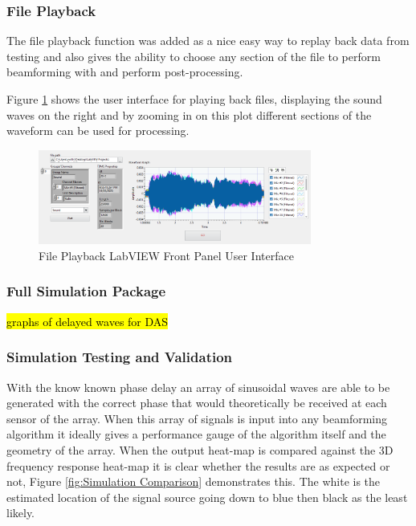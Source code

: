 \documentclass{UoNMCHA}
\numberwithin{equation}{section}
\begin{document}
\subsubsection{File Playback} \label{sec:File Playback}

The file playback function was added as a nice easy way to replay back data from testing and also gives the ability to choose any section of the file to perform beamforming with and perform post-processing.

Figure \ref{fig:FilePlaybackPanel} shows the user interface for playing back files, displaying the sound waves on the right and by zooming in on this plot different sections of the waveform can be used for processing.

    \begin{figure}[H]
        \centering
        \includegraphics[keepaspectratio, width = 0.8\textwidth]{Figures/FilePlaybackPanel.png}
        \caption{File Playback LabVIEW Front Panel User Interface}
        \label{fig:FilePlaybackPanel}
    \end{figure}  

\subsubsection{Full Simulation Package} \label{sec:Full Simulation Package}
    \hl{graphs of delayed waves for DAS}
\subsubsection{Simulation Testing and Validation} \label{sec:Sim Testing and Verification} 
    
    With the know known phase delay an array of sinusoidal waves are able to be generated with the correct phase that would theoretically be received at each sensor of the array. When this array of signals is input into any beamforming algorithm it ideally gives a performance gauge of the algorithm itself and the geometry of the array. When the output heat-map is compared against the 3D frequency response heat-map it is clear whether the results are as expected or not, Figure \ref{fig:Simulation Comparison} demonstrates this. The white is the estimated location of the signal source going down to blue then black as the least likely.
    
\end{document}
